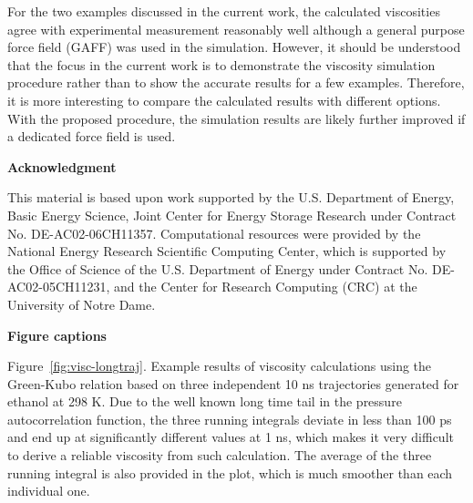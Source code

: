 \documentclass[12pt]{article}
\begin{document}
For the two examples discussed in the current work,
the calculated viscosities agree with experimental measurement reasonably well
although a general purpose force field (GAFF) was used in the simulation.
However, it should be understood that the focus in the current work is to demonstrate the viscosity simulation procedure
rather than to show the accurate results for a few examples.
Therefore, it is more interesting to compare the calculated results with different options.
With the proposed procedure,
the simulation results are likely further improved if a dedicated force field is used.
\cite{Andreussi.JCP.137.044508.2012,
Chaban.JPCB.118.10716.2014}


\vspace{7 mm}
{\bf\Large Acknowledgment}

This material is based upon work supported by
the U.S. Department of Energy, Basic Energy Science, Joint Center for Energy Storage Research under Contract No. DE-AC02-06CH11357. 
Computational resources were provided by the National Energy Research Scientific Computing Center,
which is supported by the Office of Science of the U.S. Department of Energy under Contract No. DE-AC02-05CH11231,
and the Center for Research Computing (CRC) at the University of Notre Dame.


\newpage
\clearpage


%
%
%






\newpage
\clearpage
{\bf\Large Figure captions}
\vspace{7 mm}

Figure~\ref{fig:visc-longtraj}.
Example results of viscosity calculations using the Green-Kubo relation 
based on three independent 10 ns trajectories generated for ethanol at 298 K.
Due to the well known long time tail in the pressure autocorrelation function,
the three running integrals deviate in less than 100 ps and end up at significantly different values at 1 ns,
which makes it very difficult to derive a reliable viscosity from such calculation.
The average of the three running integral is also provided in the plot, 
which is much smoother than each individual one.
\end{document}
